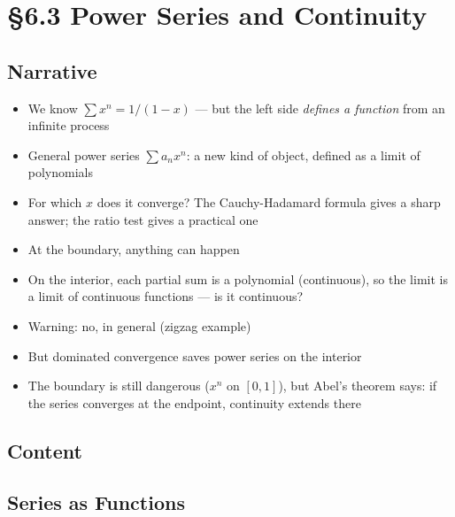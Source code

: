 \documentclass[
  10pt,
  letterpaper,
]{scrbook}
\providecommand{\tightlist}{%
  \setlength{\itemsep}{0pt}\setlength{\parskip}{0pt}}
\begin{document}
\section{§6.3 Power Series and
Continuity}\label{power-series-and-continuity}

\subsection{Narrative}\label{narrative-26}

\begin{itemize}
\tightlist
\item
  We know \(\sum x^n = 1/(1-x)\) --- but the left side \emph{defines a
  function} from an infinite process
\item
  General power series \(\sum a_n x^n\): a new kind of object, defined
  as a limit of polynomials
\item
  For which \(x\) does it converge? The Cauchy-Hadamard formula gives a
  sharp answer; the ratio test gives a practical one
\item
  At the boundary, anything can happen
\item
  On the interior, each partial sum is a polynomial (continuous), so the
  limit is a limit of continuous functions --- is it continuous?
\item
  Warning: no, in general (zigzag example)
\item
  But dominated convergence saves power series on the interior
\item
  The boundary is still dangerous (\(x^n\) on \([0,1]\)), but Abel's
  theorem says: if the series converges at the endpoint, continuity
  extends there
\end{itemize}

\subsection{Content}\label{content-26}

\subsection{Series as Functions}\label{series-as-functions}
\end{document}
